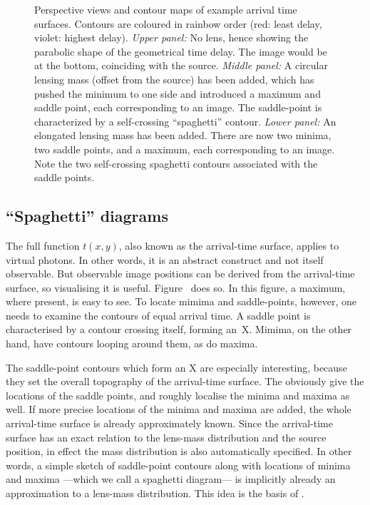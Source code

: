 \begin{figure}
\caption{Perspective views and contour maps of example arrival time
  surfaces.  Contours are coloured in rainbow order (red: least delay,
  violet: highest delay).  {\em Upper panel:\/} No lens, hence showing
  the parabolic shape of the geometrical time delay.  The image would
  be at the bottom, coinciding with the source. {\em Middle panel:\/}
  A circular lensing mass (offset from the source) has been added,
  which has pushed the minimum to one side and introduced a maximum
  and saddle point, each corresponding to an image.  The saddle-point
  is characterized by a self-crossing ``spaghetti'' contour. {\em
    Lower panel:\/} An elongated lensing mass has been added.  There
  are now two minima, two saddle points, and a maximum, each
  corresponding to an image.  Note the two self-crossing spaghetti
  contours associated with the saddle points.}
\label{fig:arriv}
\end{figure}


\subsection{``Spaghetti'' diagrams} \label{sec:arriv}

The full function $t(x,y)$, also known as the arrival-time surface,
applies to virtual photons.  In other words, it is an abstract
construct and not itself observable.  But observable image positions
can be derived from the arrival-time surface, so visualising it is
useful.  Figure~ does so.  In this figure, a maximum,
where present, is easy to see.  To locate mimima and saddle-points,
however, one needs to examine the contours of equal arrival time.  A
saddle point is characterised by a contour crossing itself, forming
an~X.  Mimima, on the other hand, have contours looping around them,
as do maxima.

The saddle-point contours which form an X are especially interesting,
because they set the overall topography of the arrival-time surface.
The obviously give the locations of the saddle points, and roughly
localise the minima and maxima as well.  If more precise locations of
the minima and maxima are added, the whole arrival-time surface is
already approximately known.  Since the arrival-time surface has an
exact relation to the lens-mass distribution and the source position,
in effect the mass distribution is also automatically specified.  In
other words, a simple sketch of saddle-point contours along with
locations of minima and maxima ---which we call a spaghetti diagram---
is implicitly already an approximation to a lens-mass distribution.
This idea is the basis of \spl.

